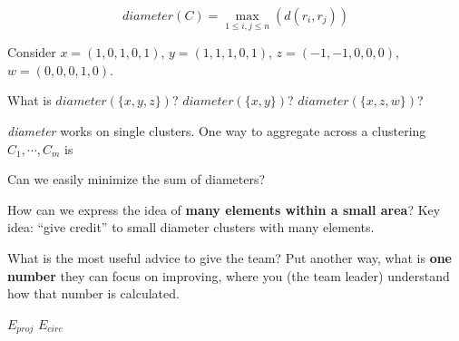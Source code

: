 $$\textit{diameter}(C) = \max_{1 \leq i, j \leq n} (d(r_i, r_j))$$ 

Consider $x = (1, 0, 1, 0, 1)$, $y = (1, 1, 1, 0, 1)$, $z = (-1, -1, 0, 0, 0)$, $w = (0, 0, 0, 1, 0)$.

What is $\textit{diameter}(\{x, y, z\})$? $\textit{diameter}(\{x, y\})$? $\textit{diameter}(\{x, z, w\})$?


\vfill

\textit{diameter} works on single clusters. One way to aggregate across a
clustering $C_1, \cdots, C_m$ is \underline{\hspace{15em}}

Can we easily minimize the sum of diameters?

\vfill

How can we express the idea of {\bf many elements within a small area}? Key idea: ``give credit'' to small diameter clusters with many elements.

\vfill

What is the most useful advice to give the team? Put another way, what is {\bf one number} they can focus on improving, where you (the team leader) understand how that number is calculated.

\vfill



$E_{proj}$
$E_{circ}$